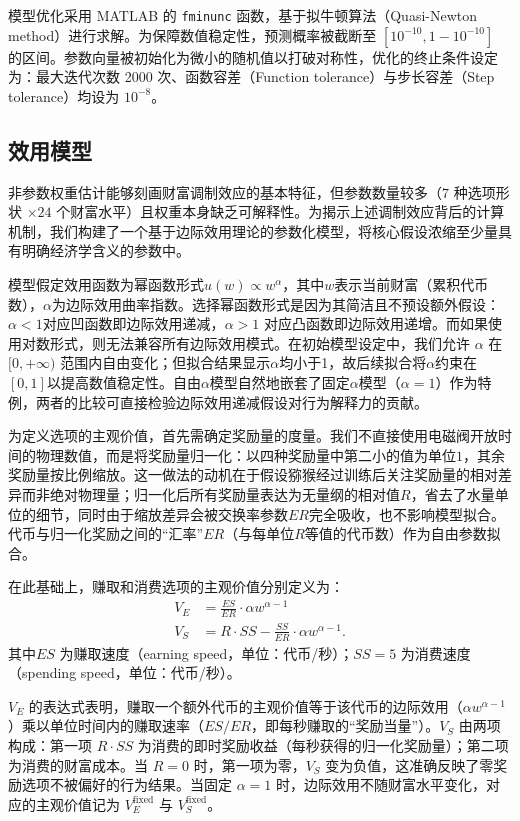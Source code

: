 模型优化采用 MATLAB 的 \texttt{fminunc} 函数，基于拟牛顿算法（Quasi-Newton method）进行求解。为保障数值稳定性，预测概率被截断至 $[10^{-10}, 1 - 10^{-10}]$ 的区间。参数向量被初始化为微小的随机值以打破对称性，优化的终止条件设定为：最大迭代次数 2000 次、函数容差（Function tolerance）与步长容差（Step tolerance）均设为 $10^{-8}$。

\subsection{效用模型}\label{chap2:methods_BHV_utility}
非参数权重估计能够刻画财富调制效应的基本特征，但参数数量较多（$7$ 种选项形状 $\times 24$ 个财富水平）且权重本身缺乏可解释性。为揭示上述调制效应背后的计算机制，我们构建了一个基于边际效用理论的参数化模型，将核心假设浓缩至少量具有明确经济学含义的参数中。

模型假定效用函数为幂函数形式$u(w) \propto w^\alpha$，其中$w$表示当前财富（累积代币数），$\alpha$为边际效用曲率指数。选择幂函数形式是因为其简洁且不预设额外假设：$\alpha < 1$对应凹函数即边际效用递减，$\alpha > 1$ 对应凸函数即边际效用递增。而如果使用对数形式\citep{bernoulli1954exposition}，则无法兼容所有边际效用模式。在初始模型设定中，我们允许 $\alpha$ 在 $[0, +\infty)$ 范围内自由变化；但拟合结果显示$\alpha$均小于1，故后续拟合将$\alpha$约束在 $[0,1]$以提高数值稳定性。自由$\alpha$模型自然地嵌套了固定$\alpha$模型（$\alpha = 1$）作为特例，两者的比较可直接检验边际效用递减假设对行为解释力的贡献。

为定义选项的主观价值，首先需确定奖励量的度量。我们不直接使用电磁阀开放时间的物理数值，而是将奖励量归一化：以四种奖励量中第二小的值为单位$1$，其余奖励量按比例缩放。这一做法的动机在于假设猕猴经过训练后关注奖励量的相对差异而非绝对物理量；归一化后所有奖励量表达为无量纲的相对值$R$，省去了水量单位的细节，同时由于缩放差异会被交换率参数$ER$完全吸收，也不影响模型拟合。代币与归一化奖励之间的“汇率”$ER$（与每单位$R$等值的代币数）作为自由参数拟合。

在此基础上，赚取和消费选项的主观价值分别定义为：
\begin{align}
V_{E} &= \frac{ES}{ER} \cdot \alpha w^{\alpha - 1}\\
V_{S} &= R \cdot SS - \frac{SS}{ER} \cdot \alpha w^{\alpha - 1}.
\end{align}
其中$ES$ 为赚取速度（earning speed，单位：代币/秒）；$SS = 5$ 为消费速度（spending speed，单位：代币/秒）。

$V_{E}$ 的表达式表明，赚取一个额外代币的主观价值等于该代币的边际效用（$\alpha w^{\alpha - 1}$）乘以单位时间内的赚取速率（$ES/ER$，即每秒赚取的“奖励当量”）。$V_{S}$ 由两项构成：第一项 $R \cdot SS$ 为消费的即时奖励收益（每秒获得的归一化奖励量）；第二项为消费的财富成本。当 $R = 0$ 时，第一项为零，$V_{S}$ 变为负值，这准确反映了零奖励选项不被偏好的行为结果。当固定 $\alpha = 1$ 时，边际效用不随财富水平变化，对应的主观价值记为 $V_{E}^{\text{fixed}}$ 与 $V_{S}^{\text{fixed}}$。

